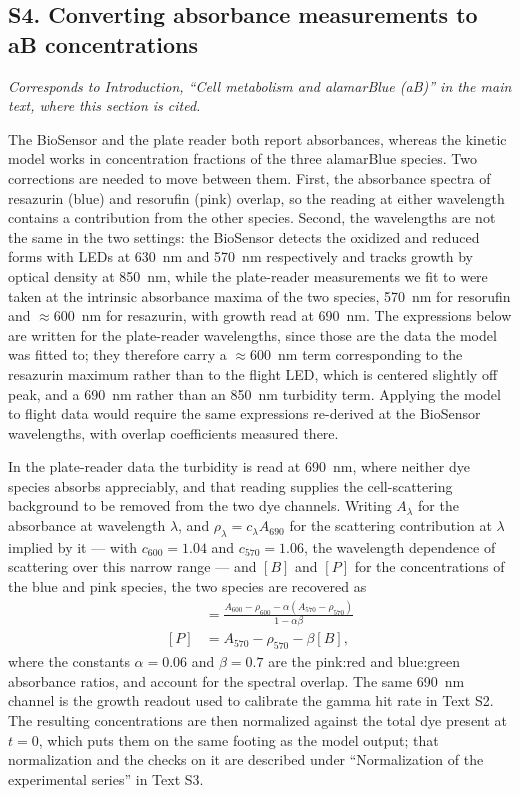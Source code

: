 \documentclass[11pt]{article}
\begin{document}
\clearpage

\subsection{S4. Converting absorbance measurements to aB concentrations}
\label{sec:absorbance}

\textit{Corresponds to Introduction, ``Cell metabolism and alamarBlue (aB)'' in
the main text, where this section is cited.}

The BioSensor and the plate reader both report absorbances, whereas the kinetic
model works in concentration fractions of the three alamarBlue species. Two
corrections are needed to move between them. First, the absorbance spectra of
resazurin (blue) and resorufin (pink) overlap, so the reading at either wavelength
contains a contribution from the other species. Second, the wavelengths are not
the same in the two settings: the BioSensor detects the oxidized and reduced forms
with LEDs at 630~nm and 570~nm respectively and tracks growth by optical density
at 850~nm, while the plate-reader measurements we fit to were taken at the
intrinsic absorbance maxima of the two species, 570~nm for resorufin and
${\approx}600$~nm for resazurin, with growth read at 690~nm. The expressions below
are written for the plate-reader wavelengths, since those are the data the model was
fitted to; they therefore carry a ${\approx}600$~nm term corresponding to the
resazurin maximum rather than to the flight LED, which is centered slightly off
peak, and a 690~nm rather than an 850~nm turbidity term. Applying the model to
flight data would require the same expressions re-derived at the BioSensor
wavelengths, with overlap coefficients measured there.

In the plate-reader data the turbidity is read at 690~nm, where neither dye species
absorbs appreciably, and that reading supplies the cell-scattering background to be
removed from the two dye channels. Writing $A_\lambda$ for the absorbance at
wavelength $\lambda$, and $\rho_\lambda = c_\lambda A_{690}$ for the scattering
contribution at $\lambda$ implied by it --- with $c_{600} = 1.04$ and
$c_{570} = 1.06$, the wavelength dependence of scattering over this narrow range ---
and $[B]$ and $[P]$ for the concentrations of the blue and pink species, the two
species are recovered as
\begin{align}
    [B] &= \frac{A_{600} - \rho_{600} - \alpha(A_{570} - \rho_{570})}{1 - \alpha\beta}
    \label{eq:S_conc_B}
    \\
    [P] &= A_{570} - \rho_{570} - \beta[B] ,
    \label{eq:S_conc_P}
\end{align}
where the constants $\alpha = 0.06$ and $\beta = 0.7$ are the pink:red and
blue:green absorbance ratios, and account for the spectral overlap. The same
690~nm channel is the growth readout used to calibrate the gamma hit rate in
Text S2. The resulting
concentrations are then normalized against the total dye present at $t = 0$, which
puts them on the same footing as the model output; that normalization and the
checks on it are described under ``Normalization of the experimental series'' in
Text S3.
\end{document}
